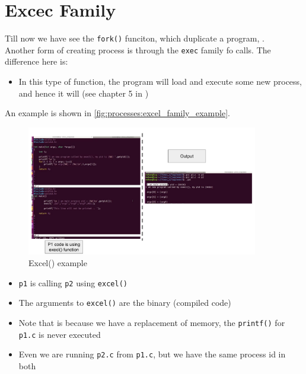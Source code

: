 \documentclass[12pt,a4paper]{book}
\begin{document}
\newpage
\section{Excec Family}

Till now we have see the \verb|fork()| funciton, which duplicate a program, .\\

Another form of creating process is through the \verb|exec| family fo calls. The difference here is:

	\begin{itemize}
	\item In this type of function, the program will load and execute some new process, and hence it will  (see chapter 5 in \cite{book_Linux_System_Programming_Robert_Love}) 
	\end{itemize}


An example is shown in \autoref{fig:processes:excel_family_example}.

\begin{figure}[h]
\centering
\includegraphics[width = 0.9\textwidth, frame]{Figures/processes/excel_family_example}
\caption{Excel() example}
\label{fig:processes:excel_family_example}
\end{figure}

	\begin{itemize}
	
	\item \verb|p1| is calling \verb|p2| using \verb|excel()|
	
	\item The arguments to \verb|excel()| are the binary (compiled 		code)
	
	\item Note that is because we have a replacement of memory, the \verb|printf()| for \verb|p1.c| is never executed
	
	\item Even we are running \verb|p2.c| from \verb|p1.c|, but we have the same process id in both
	
	\end{itemize}
\end{document}
